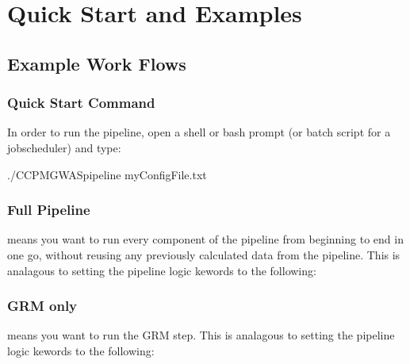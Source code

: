 \documentclass[letterpaper,10pt,english]{sphinxmanual}
\begin{document}
\chapter{Quick Start and Examples}
\label{\detokenize{index:quick-start-and-examples}}

\section{Example Work Flows}
\label{\detokenize{exampleWorkFlows:example-work-flows}}\label{\detokenize{exampleWorkFlows::doc}}

\subsection{Quick Start Command}
\label{\detokenize{exampleWorkFlows:quick-start-command}}
In order to run the pipeline, open a shell or bash prompt (or batch script for a job\sphinxhyphen{}scheduler) and type:

\begin{sphinxVerbatim}[commandchars=\\\{\}]
\PYGZdl{} ./CCPM\PYGZus{}GWAS\PYGZus{}pipeline myConfigFile.txt
\end{sphinxVerbatim}


\subsection{Full Pipeline}
\label{\detokenize{exampleWorkFlows:full-pipeline}}
 means you want to run every component of the pipeline from beginning to end in one go, without re\sphinxhyphen{}using any previously calculated data from the pipeline.  This is analagous to setting the pipeline logic kewords to the following:

\begin{sphinxVerbatim}[commandchars=\\\{\}]
\end{sphinxVerbatim}


\subsection{GRM only}
\label{\detokenize{exampleWorkFlows:grm-only}}
 means you want to run the GRM step.  This is analagous to setting the pipeline logic kewords to the following:
\end{document}
